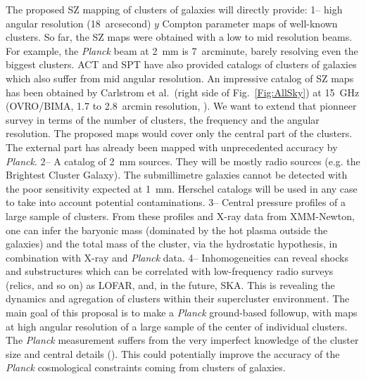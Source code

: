 \documentclass[11pt,a4paper,twoside,graphicx,color]{article}
\begin{document}
\vspace{-0.1cm}  The
proposed SZ mapping of clusters of galaxies will directly provide: 1--
high angular resolution (18~arcsecond) $y$ Compton parameter maps of
well-known clusters. So far, the SZ maps were obtained with a low to
mid resolution beams. For example, the {\sl Planck} beam at 2~mm is
7~arcminute, barely resolving even the biggest clusters. ACT and SPT
have also provided catalogs of clusters of galaxies which also suffer
from mid angular resolution. An impressive catalog of SZ maps has been
obtained by Carlstrom et al.~(right side of Fig.~\ref{Fig:AllSky}) at
15~GHz (OVRO/BIMA, 1.7 to 2.8~arcmin resolution, \cite{Reese2002}). We
want to extend that pionneer survey in terms of the number of
clusters, the frequency and the angular resolution. The proposed maps
would cover only the central part of the clusters. The external part
has already been mapped with unprecedented accuracy by {\sl
  Planck}. 2-- A catalog of 2~mm sources. They will be mostly radio
sources (e.g. the Brightest Cluster Galaxy). The submillimetre
galaxies cannot be detected with the poor sensitivity expected at
1~mm. Herschel catalogs will be used in any case to take into account
potential contaminations. 3-- Central pressure profiles of a large
sample of clusters. From these profiles and X-ray data from
XMM-Newton, one can infer the baryonic mass (dominated by the hot
plasma outside the galaxies) and the total mass of the cluster, via
the hydrostatic hypothesis, in combination with X-ray and {\sl Planck}
data. 4-- Inhomogeneities can reveal shocks and substructures which
can be correlated with low-frequency radio surveys (relics, and so on)
as LOFAR, and, in the future, SKA. This is revealing the dynamics and
agregation of clusters within their supercluster environment. The main
goal of this proposal is to make a {\sl Planck} ground-based followup,
with maps at high angular resolution of a large sample of the center
of individual clusters. The {\sl Planck} measurement suffers from the
very imperfect knowledge of the cluster size and central details
(\cite{Planck2013PressProf}). This could potentially improve the
accuracy of the {\sl Planck} cosmological constraints coming from
clusters of galaxies.
\end{document}

